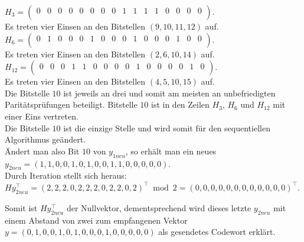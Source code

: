 \begin{Beispiel}
    $H_3= \left( \begin{array}{rrrrrrrrrrrrrrrr}
        0 & 0 & 0 & 0 & 0 & 0 & 0 & 0 & 1 & 1 & 1 & 1 & 0 & 0 & 0 & 0 \\
       \end{array}\right). 
    $\\
    Es treten vier Einsen an den Bitstellen $(9, 10, 11, 12)$ auf.\\
    
    $H_6= \left( \begin{array}{rrrrrrrrrrrrrrrr}
        0 & 1 & 0 & 0 & 0 & 1 & 0 & 0 & 0 & 1 & 0 & 0 & 0 & 1 & 0 & 0 \\
       \end{array}\right). 
    $\\
    Es treten vier Einsen an den Bitstellen $(2, 6, 10, 14)$ auf.\\
    
    $H_{12}= \left( \begin{array}{rrrrrrrrrrrrrrrr}
        0 & 0 & 0 & 1 & 1 & 0 & 0 & 0 & 0 & 1 & 0 & 0 & 0 & 0 & 1 & 0 \\
       \end{array}\right). 
    $\\
    Es treten vier Einsen an den Bitstellen $(4, 5, 10, 15)$ auf.\\
    
    
    Die Bitstelle $10$ ist jeweils an drei und somit am meisten an unbefriedigten Paritätsprüfungen beteiligt. 
    Bitstelle $10$ ist in den Zeilen $H_3$, $H_6$ und $H_{12}$ mit einer Eins vertreten.\\
    Die Bitstelle $10$ ist die einzige Stelle und wird somit für den sequentiellen Algorithmus geändert.\\
    
    Ändert man also Bit $10$ von $y_{1neu}$, so erhält man ein neues\\
    $y_{2neu} = (1,1,0,0,1,0,1,0,0,1,1,0,0,0,0,0).$\\
    
    Durch Iteration stellt sich heraus:\\
    $Hy_{2neu}^\intercal= (2,2,2,0,2,2,2,0,2,2,0,2)^\intercal \bmod 2= (0,0,0,0,0,0,0,0,0,0,0,0)^\intercal.$\\
    \pagebreak
    
    Somit ist $Hy_{2neu}^\intercal$ der Nullvektor, dementsprechend wird dieses letzte $y_{2neu}$  mit einem Abstand von zwei zum empfangenen Vektor\\
    $y = (0,1,0,0,1,0,1,0,0,0,1,0,0,0,0,0)$ als gesendetes Codewort erklärt.\\
    

\end{Beispiel}
